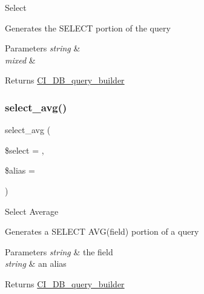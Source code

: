 Select

Generates the S\+E\+L\+E\+CT portion of the query


\begin{DoxyParams}{Parameters}
{\em string} & \\
\hline
{\em mixed} & \\
\hline
\end{DoxyParams}
\begin{DoxyReturn}{Returns}
\mbox{\hyperlink{class_c_i___d_b__query__builder}{C\+I\+\_\+\+D\+B\+\_\+query\+\_\+builder}} 
\end{DoxyReturn}
\mbox{\label{class_c_i___d_b__query__builder_a0377f6833e394c977823e21413772761}} 
\subsubsection{\texorpdfstring{select\+\_\+avg()}{select\_avg()}}
{\footnotesize\ttfamily select\+\_\+avg (\begin{DoxyParamCaption}\item[{}]{\$select = {\ttfamily \textquotesingle{}\textquotesingle{}},  }\item[{}]{\$alias = {\ttfamily \textquotesingle{}\textquotesingle{}} }\end{DoxyParamCaption})}

Select Average

Generates a S\+E\+L\+E\+CT A\+V\+G(field) portion of a query


\begin{DoxyParams}{Parameters}
{\em string} & the field \\
\hline
{\em string} & an alias \\
\hline
\end{DoxyParams}
\begin{DoxyReturn}{Returns}
\mbox{\hyperlink{class_c_i___d_b__query__builder}{C\+I\+\_\+\+D\+B\+\_\+query\+\_\+builder}} 
\end{DoxyReturn}
\mbox{\label{class_c_i___d_b__query__builder_a4eac30ba8703ba8f62664e3b4ea1a177}} 
